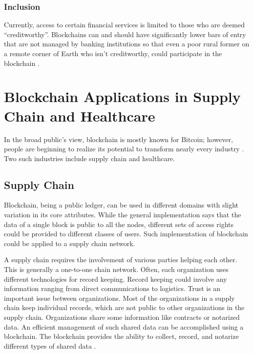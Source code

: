\documentclass[sigconf]{acmart}
\begin{document}
\subsubsection{Inclusion} Currently, access to certain financial services is limited to those who are deemed ``creditworthy''. Blockchains can and should have significantly lower bars of entry that are not managed by banking institutions so that even a poor rural former on a remote corner of Earth who isn't creditworthy, could participate in the blockchain \cite{tapscott}.





\section{Blockchain Applications in Supply Chain and Healthcare}
In the broad public's view, blockchain is mostly known for Bitcoin; however, people are beginning to realize its potential to transform nearly every industry \cite{hbr}. Two such industries include supply chain and healthcare.

\subsection{Supply Chain}
Blockchain, being a public ledger, can be used in different domains with slight variation in its core attributes. While the general implementation says that the data of a single block is public to all the nodes, different sets of access rights could be provided to different classes of users.  Such implementation of blockchain could be applied to a supply chain network. 

A supply chain requires the involvement of various parties helping each other. This is generally a one-to-one chain network. Often, each organization uses different technologies for record keeping. Record keeping could involve any information ranging from direct communications to logistics. Trust is an important issue between organizations. Most of the organizations in a supply chain keep individual records, which are not public to other organizations in the supply chain. Organizations share some information like contracts or notarized data. An efficient management of such shared data can be accomplished using a blockchain. The blockchain provides the ability to collect, record, and notarize different types of shared data \cite{arbc1}. 
\end{document}
